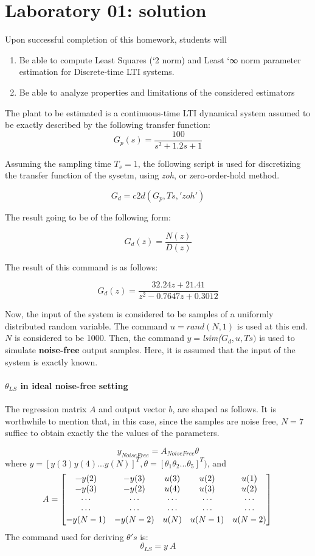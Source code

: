 \chapter{Laboratory 01: solution}

Upon successful completion of this homework, students will
\begin{enumerate}
\item Be able to compute Least Squares (`2 norm) and Least `∞ norm parameter estimation for
Discrete-time LTI systems.
\item Be able to analyze properties and limitations of the considered estimators
\end{enumerate}

The plant to be estimated is a continuous-time LTI dynamical system assumed to be exactly described by the following transfer function:
\[
G_p(s) = \frac {100}{s^2 + 1.2 s + 1}
\]

Assuming the sampling time \(T_s = 1\), the following script is used for discretizing the transfer function of the sysetm, using \textit{zoh}, or zero-order-hold method.

\[G_d = c2d(G_p, Ts, 'zoh')\]

The result going to be of the following form:

\[G_d(z) = \frac{N(z)}{D(z)}\]

The result of this command is as follows:

\[
G_d(z) = \frac{32.24z + 21.41}{z^2 - 0.7647z + 0.3012}
\]

Now, the input of the system is considered to be samples of a uniformly distributed random variable. The command \textit{\(u = rand(N,1)\)} is used at this end. \(N\) is considered to be 1000. Then, the command \textit{ \(y =\)lsim(\(G_d, u, Ts)\)} is used to simulate \textbf{noise-free} output samples. Here, it is assumed that the input of the system is exactly known.


\subsubsection{\(\theta_{LS}\) in ideal noise-free setting}
The regression matrix \(A\) and output vector \(b\), are shaped as follows. It is worthwhile to mention that, in this case, since the samples are noise free, \(N = 7\) suffice to obtain exactly the the values of the parameters.

\[
    y_{Noise Free} = A_{Noise Free}\theta
\]
where \(y = [y(3) y(4) ... y(N)]^T, \theta = [\theta_1 \theta_2 ... \theta_5]^T)\), and
\[
    A = \left[
    \begin{matrix}
    -y(2) & -y(3) & u(3) & u(2) & u(1) \\
    -y(3) & -y(2) & u(4) & u(3) & u(2) \\
    \cdots & \cdots & \cdots & \cdots & \cdots   \\
    \cdots & \cdots & \cdots & \cdots & \cdots   \\
    -y(N-1) & -y(N-2) & u(N) & u(N-1) & u(N-2)
    \end{matrix} 
    \right]\\
\]
The command used for deriving \(\theta's\) is:
\[
\theta_{LS} = y \ A
\]

